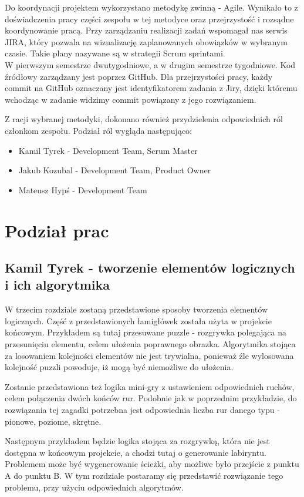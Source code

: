 \documentclass[oneside,polski,logo]{amuthesis}
\begin{document}
Do koordynacji projektem wykorzystano metodykę zwinną - Agile. Wynikało to z doświadczenia pracy części zespołu w tej metodyce oraz przejrzystość i rozsądne koordynowanie pracą. Przy zarządzaniu realizacji zadań wspomagał nas serwis JIRA, który pozwala na wizualizację zaplanowanych obowiązków w wybranym czasie. Takie plany nazywane są w strategii Scrum sprintami.\\ W pierwszym semestrze dwutygodniowe, a w drugim semestrze tygodniowe. Kod źródłowy zarządzany jest poprzez GitHub. Dla przejrzystości pracy, każdy commit na GitHub oznaczany jest identyfikatorem zadania z Jiry, dzięki któremu wchodząc w zadanie widzimy commit powiązany z jego rozwiązaniem. 

Z racji wybranej metodyki, dokonano również przydzielenia odpowiednich ról członkom zespołu. Podział ról wygląda następująco:

\begin{itemize}
	\item Kamil Tyrek - Development Team, Scrum Master
	\item Jakub Kozubal - Development Team, Product Owner
	\item Mateusz Hypś - Development Team
\end{itemize}

\section{Podział prac}
\subsection{Kamil Tyrek - tworzenie elementów logicznych i ich algorytmika}
W trzecim rozdziale zostaną przedstawione sposoby tworzenia elementów logicznych. Część z przedstawionych łamigłówek została użyta w projekcie końcowym. Przykładem są tutaj przesuwane puzzle - rozgrywka polegająca na przesunięciu elementu, celem ułożenia poprawnego obrazka. Algorytmika stojąca za losowaniem kolejności elementów nie jest trywialna, ponieważ źle wylosowana kolejność puzzli powoduje, iż mogą być niemożliwe do ułożenia.

Zostanie przedstawiona też logika mini-gry z ustawieniem odpowiednich ruchów, celem połączenia dwóch końców rur. Podobnie jak w poprzednim przykładzie, do rozwiązania tej zagadki potrzebna jest odpowiednia liczba rur danego typu - pionowe, poziome, skrętne. 

Następnym przykładem będzie logika stojąca za rozgrywką, która nie jest dostępna w końcowym projekcie, a chodzi tutaj o generowanie labiryntu. Problemem może być wygenerowanie ścieżki, aby możliwe było przejście z punktu A do punktu B. W tym rozdziale postaramy się przedstawić rozwiązanie tego problemu, przy użyciu odpowiednich algorytmów.
\end{document}
